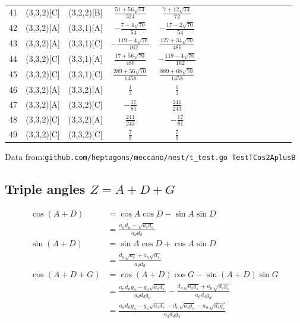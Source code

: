 \documentclass[11pt]{article}
\begin{document}
\begin{longtable}{ | p{1cm}| *{15}{c|} }
41 & (3,3,2)[C] & (3,2,2)[B] & $\frac{51+56\sqrt{14}}{324}$ & $\frac{7+12\sqrt{14}}{72}$\\
42 & (3,3,2)[A] & (3,3,1)[A] & $-\frac{7-4\sqrt{70}}{54}$ & $-\frac{17-2\sqrt{70}}{54}$\\
43 & (3,3,2)[A] & (3,3,1)[C] & $-\frac{119-4\sqrt{70}}{162}$ & $\frac{127+34\sqrt{70}}{486}$\\
44 & (3,3,2)[C] & (3,3,1)[A] & $\frac{17+56\sqrt{70}}{486}$ & $-\frac{119-4\sqrt{70}}{162}$\\
45 & (3,3,2)[C] & (3,3,1)[C] & $\frac{289+56\sqrt{70}}{1458}$ & $\frac{889+68\sqrt{70}}{1458}$\\
46 & (3,3,2)[A] & (3,3,2)[A] & $\frac{1}{3}$ & $\frac{1}{3}$\\
47 & (3,3,2)[A] & (3,3,2)[C] & $-\frac{17}{81}$ & $\frac{241}{243}$\\
48 & (3,3,2)[C] & (3,3,2)[A] & $\frac{241}{243}$ & $-\frac{17}{81}$\\
49 & (3,3,2)[C] & (3,3,2)[C] & $\frac{7}{9}$ & $\frac{7}{9}$\\
\end{longtable}
Data from:\texttt{github.com/heptagons/meccano/nest/t\_test.go TestTCos2AplusB}

\subsection{Triple angles $Z = A+D+G$}

\begin{align}
\cos{(A+D)} &= \cos{A}\cos{D} - \sin{A}\sin{D} \nonumber\\
 &= \frac{a_nd_n - \sqrt{a_sd_s}}{a_dd_d}\\
\sin{(A+D)} &= \sin{A}\cos{D} + \cos{A}\sin{D} \nonumber\\
 &= \frac{d_n\sqrt{a_s} + a_n\sqrt{d_s}}{a_dd_d}\\
\cos{(A+D+G)} &= \cos{(A+D)}\cos{G} - \sin{(A+D)}\sin{G} \nonumber\\
 &= \frac{a_nd_ng_n - g_n\sqrt{a_sd_s}}{a_dd_dg_d}
 -\frac{d_n\sqrt{a_sg_s} + a_n\sqrt{d_sg_s}}{a_dd_dg_d} \nonumber\\
 &= \frac{a_nd_ng_n - g_n\sqrt{a_sd_s} - d_n\sqrt{a_sg_s} - a_n\sqrt{d_sg_s}}{a_dd_dg_d}
\end{align}
\end{document}

